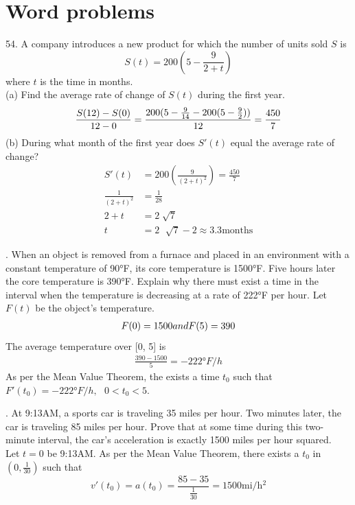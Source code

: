 \documentclass[11pt]{article}
\begin{document}
\section{Word problems}
54. A company introduces a new product for which the number of units sold $S$ is \[S(t)=200\left(5-\frac{9}{2+t}\right)\] where $t$ is the time in months.\\
(a) Find the average rate of change of $S(t)$ during the first year.
\begin{eqnarray}
    \setcounter{equation}{1}
    \frac{S(12)-S(0)}{12-0}=\frac{200(5-\frac{9}{14}-200(5-\frac{9}{2}))}{12}=\frac{450}{7}
\end{eqnarray}
(b) During what month of the first year does $S'(t)$ equal the average rate of change?
\begin{eqnarray}
    S'(t)&=200\left(\frac{9}{(2+t)^2}\right)=\frac{450}{7}\\
    \frac{1}{(2+t)^2}&=\frac{1}{28}\\
    2+t&=2\sqrt[]{7}\\
    t&=2\,\,\sqrt[]{7}-2\approx 3.3 \text{months}
\end{eqnarray}

\vspace{1cm}
. When an object is removed from a furnace and placed in an environment with a constant temperature of 90°F, its core temperature is 1500°F. Five hours later the core temperature is 390°F. Explain why there must exist a time in the interval when the temperature is decreasing at a rate of 222°F per hour.
Let $F(t)$ be the object's temperature.
\begin{eqnarray}
    \setcounter{equation}{1}
    F(0)=1500 and F(5)=390
\end{eqnarray}
The average temperature over [0, 5] is
\begin{eqnarray}
    \frac{390-1500}{5}=-222\text{°}F/h
\end{eqnarray}
As per the Mean Value Theorem, the exists a time $t_0$ such that $F'(t_0)=-222\text{°}F/h,\,\,\,\,0<t_0<5$.

\vspace{1cm}
. At 9:13AM, a sports car is traveling 35 miles per hour. Two minutes later, the car is traveling 85 miles per hour. Prove that at some time during this two-minute interval, the car's acceleration is exactly 1500 miles per hour squared.\\
Let $t=0$ be 9:13AM. As per the Mean Value Theorem, there exists a $t_0$ in $(0, \frac{1}{30})$ such that
\[v'(t_0)=a(t_0)=\frac{85-35}{\frac{1}{30}}=1500\text{mi/h$^2$}\]
\end{document}
